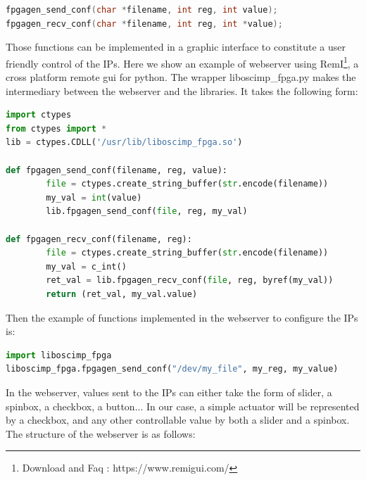 \documentclass[12pt,oneside]{article}
\begin{document}
\vspace{-0.2cm}
\begin{lstlisting}[language=C]
fpgagen_send_conf(char *filename, int reg, int value); 
fpgagen_recv_conf(char *filename, int reg, int *value);
\end{lstlisting}

\hspace{1cm}

Those functions can be implemented in a graphic interface to constitute a user friendly control of the IPs. Here we show an example of webserver using RemI\footnote{Download and Faq : https://www.remigui.com/}, a cross platform remote gui for python. The wrapper liboscimp\_fpga.py makes the intermediary between the webserver and the libraries. It takes the following form:

\vspace{-0.2cm}
\begin{lstlisting}[language=Python]
import ctypes
from ctypes import *
lib = ctypes.CDLL('/usr/lib/liboscimp_fpga.so')

def fpgagen_send_conf(filename, reg, value):
		file = ctypes.create_string_buffer(str.encode(filename))
		my_val = int(value)
		lib.fpgagen_send_conf(file, reg, my_val)

def fpgagen_recv_conf(filename, reg):
		file = ctypes.create_string_buffer(str.encode(filename))
		my_val = c_int()
		ret_val = lib.fpgagen_recv_conf(file, reg, byref(my_val))
		return (ret_val, my_val.value)
\end{lstlisting}

\hspace{1cm}

Then the example of functions implemented in the webserver to configure the IPs is:

\vspace{-0.2cm}
\begin{lstlisting}[language=Python]
import liboscimp_fpga
liboscimp_fpga.fpgagen_send_conf("/dev/my_file", my_reg, my_value)
\end{lstlisting}

\hspace{1cm}

In the webserver, values sent to the IPs can either take the form of slider, a spinbox, a checkbox, a button... In our case, a simple actuator will be represented by a checkbox, and any other controllable value by both a slider and a spinbox. The structure of the webserver is as follows:
\end{document}
